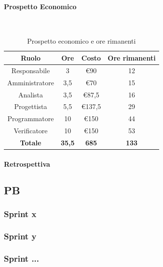 \documentclass{article}
\begin{document}
                \paragraph{Prospetto Economico}\mbox{}\\
                \begin{table}[H]
                    \centering
                    \begin{tabular}{|c|c|c|c|}
                    \hline
                    \textbf{Ruolo}  & \textbf{Ore}  & \textbf{Costo} & \textbf{Ore rimanenti} \\ \hline
                    Responsabile    & 3             & €90            & 12                     \\ \hline
                    Amministratore  & 3,5           & €70            & 15                     \\ \hline
                    Analista        & 3,5           & €87,5          & 16                     \\ \hline
                    Progettista     & 5,5           & €137,5         & 29                     \\ \hline
                    Programmatore   & 10            & €150           & 44                     \\ \hline
                    Verificatore    & 10            & €150           & 53                     \\ \hline
                    \textbf{Totale} & \textbf{35,5} & \textbf{685}   & \textbf{133}           \\ \hline
                    \end{tabular}
                    \caption{Prospetto economico e ore rimanenti}
                \end{table}

                \paragraph{Retrospettiva}
        \subsection{PB}
            \subsubsection{Sprint x}
            \subsubsection{Sprint y}
            \subsubsection{Sprint ...}

\end{document}

